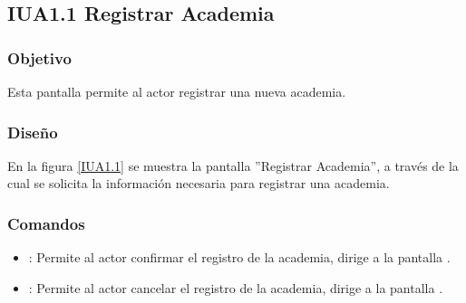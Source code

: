 \subsection{IUA1.1 Registrar Academia}

\subsubsection{Objetivo}
	Esta pantalla permite al actor registrar una nueva academia.

\subsubsection{Diseño}

    En la figura \ref{IUA1.1} se muestra la pantalla ''Registrar Academia'', a través de la cual se solicita la información necesaria para registrar una academia.
 

\subsubsection{Comandos}
    \begin{itemize}
	\item {}: Permite al actor confirmar el registro de la academia, dirige a la pantalla .
	
	\item {}: Permite al actor cancelar el registro de la academia, dirige a la pantalla .
    \end{itemize}
